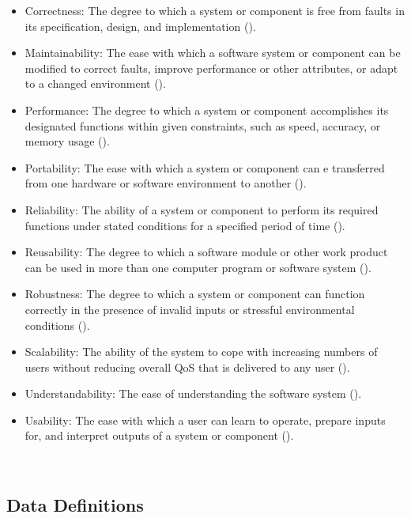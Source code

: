 \documentclass[12pt]{article}
\begin{document}
\begin{itemize}

\item Correctness: The degree to which a system or component is free from faults in its specification, design, and implementation (\citet{IEEEStdGlossarySET1990}).
\item Maintainability: The ease with which a software system or component can be modified to correct faults, improve performance or other attributes, or adapt to a changed environment (\citet{IEEEStdGlossarySET1990}).
\item Performance: The degree to which a system or component accomplishes its designated functions within given constraints, such as speed, accuracy, or memory usage (\citet{IEEEStdGlossarySET1990}).
\item Portability: The ease with which a system or component can e transferred from one hardware or software environment to another (\citet{IEEEStdGlossarySET1990}).
\item Reliability: The ability of a system or component to perform its required functions under stated conditions for a specified period of time (\citet{IEEEStdGlossarySET1990}).
\item Reusability: The degree to which a software module or other work product can be used in more than one computer program or software system (\citet{IEEEStdGlossarySET1990}).
\item Robustness: The degree to which a system or component can function correctly in the presence of invalid inputs or stressful environmental conditions (\citet{IEEEStdGlossarySET1990}).
\item Scalability: The ability of the system to cope with increasing numbers of users without reducing overall QoS that is delivered to any user (\citet{sommerville}).
\item Understandability: The ease of understanding the software system  (\citet{uchida2005experiment}).
\item Usability: The ease with which a user can learn to operate, prepare inputs for, and interpret outputs of a system or component (\citet{IEEEStdGlossarySET1990}).

\end{itemize}

~\newpage

\subsection{Data Definitions} \label{sec_datadef}
\end{document}
